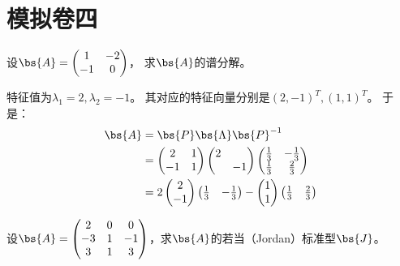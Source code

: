 \documentclass[12pt, a4paper, oneside, UTF8]{ctexbook}
\begin{document}
\else
\fi

\chapter{模拟卷四}
\begin{question} 
   设$\bs{A}=\begin{pmatrix}
    1&-2\\
    -1&0
   \end{pmatrix}$，
   求$\bs{A}$的谱分解。
\end{question}

\begin{solution}
    特征值为$\lambda_1=2,\lambda_2=-1$。
    其对应的特征向量分别是$(2,-1)^T,(1,1)^T$。
    于是：
    \begin{align*}
        \bs{A}
        &=\bs{P}\bs{\Lambda}\bs{P}^{-1}\\
        &=
        \begin{pmatrix}
            2&1\\
            -1&1
        \end{pmatrix}\begin{pmatrix}
            2&  \\
            & -1
        \end{pmatrix}\begin{pmatrix}
            \frac{1}{3}&-\frac{1}{3}\\
            \frac{1}{3}&\frac{2}{3}
        \end{pmatrix}\\
        &=2\begin{pmatrix}
            2\\
            -1
        \end{pmatrix}\begin{pmatrix}
            \frac{1}{3}&-\frac{1}{3}
        \end{pmatrix}
        -\begin{pmatrix}
            1\\
            1
        \end{pmatrix}\begin{pmatrix}
            \frac{1}{3}&\frac{2}{3}
        \end{pmatrix}
    \end{align*}
\end{solution}

\begin{question}
    设$\bs{A}=\begin{pmatrix}
        2&0&0\\
        -3&1&-1\\
        3&1&3
    \end{pmatrix}$，求$\bs{A}$的若当（Jordan）标准型$\bs{J}$。
\end{question}
\end{document}
